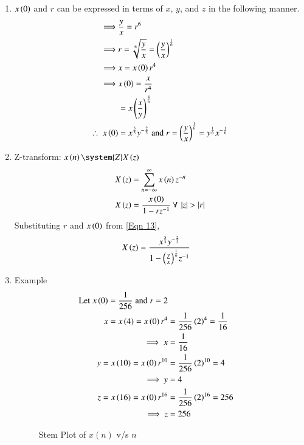 \documentclass[journal,12pt,twocolumn]{IEEEtran}
\theoremstyle{remark}
\begin{document}
\begin{enumerate}
\item
$x\left(0\right)$ and $r$ can be expressed in terms of $x$, $y$, and $z$ in the following manner.
\begin{align}
    \implies&\frac{y}{x}=r^6 \\
 \implies& r=\sqrt[6]{\frac{y}{x}}=\left(\frac{y}{x}\right)^{\frac{1}{6}}\\
    \implies&  x=x\left(0\right)r^4 \\
    \implies& x\left(0\right)=\frac{x}{r^4}\\
    &=x\left(\frac{x}{y}\right)^{\frac{4}{6}}\\
 \therefore\; x\left(0\right)&=x^{\frac{5}{3}}y^{-\frac{2}{3}}\;
 \text{and}\; r=\left(\frac{y}{x}\right)^{\frac{1}{6}}= y^{\frac{1}{6}}x^{-\frac{1}{6}} \label{Eqn 13}
\end{align}
\item 
Z-transform:    $x\brak{n} \system{Z} X\brak{z}$
\begin{align}
    X\left(z\right)&= \sum_{n=-\infty}^{\infty} x\left(n\right)z^{-n}\\
    X\left(z\right)&=\dfrac{x\left(0\right)}{1-rz^{-1}}\: \forall\: \left\vert z\right\vert>\left\vert r\right\vert
\end{align}
Substituting $r$ and $x\left(0\right)$ from \eqref{Eqn 13}, 
\begin{align}
     X\left(z\right)&=\dfrac{x^{\frac{5}{3}}y^{-\frac{2}{3}}}{1-{\left(\frac{y}{x}\right)^{\frac{1}{6}}}z^{-1}}
\end{align}
\item Example 
\begin{align}
    \text{Let}\;x\left(0\right) =\dfrac{1}{256}\;\text{and}\;r = 2\\      x=x\left(4\right)=x\left(0\right)r^4 &=\frac{1}{256}\left(2\right)^4=\frac{1}{16}\\
     \implies x&=\frac{1}{16} \\
     y=x\left(10\right)=x\left(0\right)r^{10} &=\frac{1}{256}\left(2\right)^{10}=4\\
     \implies y&=4 \\
     z=x\left(16\right)=x\left(0\right)r^{16} &=\frac{1}{256}\left(2\right)^{16}=256\\
    \implies z&=256 
\end{align}
\newpage
\begin{figure}[h]
    \renewcommand\thefigure{1}
    \centering
    \caption{Stem Plot of $x(n)$ v/s $n$}

\end{figure}
\end{enumerate}
\end{document}
